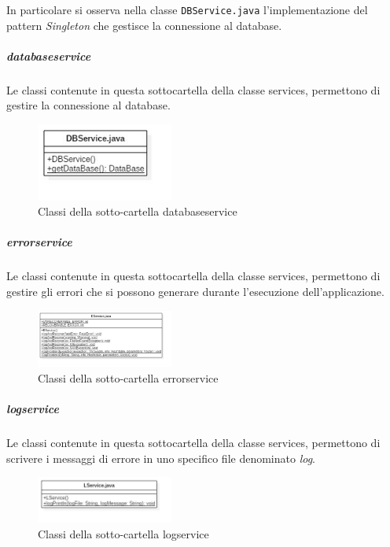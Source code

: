	In particolare si osserva nella classe \texttt{DBService.java} l'implementazione del pattern \emph{Singleton} che gestisce la connessione al database.
	
	\subparagraph{databaseservice}
	Le classi contenute in questa sottocartella della classe services, permettono di gestire la connessione al database.
	
	\begin{figure}[h]
		\centering
		\includegraphics[width=0.4\textwidth]
		{immagini/c-databaseservice}
		
		\caption{Classi della sotto-cartella databaseservice}
	\end{figure}
	
	
	\subparagraph{errorservice}
	Le classi contenute in questa sottocartella della classe services, permettono di gestire gli errori che si possono generare durante l'esecuzione dell'applicazione.
	
	\begin{figure}[h]
		\centering
		\includegraphics[width=0.4\textwidth]
		{immagini/c-errorservice}
		
		\caption{Classi della sotto-cartella errorservice}
	\end{figure}
	
	
	\subparagraph{logservice}
	Le classi contenute in questa sottocartella della classe services, permettono di scrivere i messaggi di errore in uno specifico file denominato \emph{log}.
	
	\begin{figure}[h]
		\centering
		\includegraphics[width=0.4\textwidth]
		{immagini/c-logservice}
		
		\caption{Classi della sotto-cartella logservice}
	\end{figure}
	
